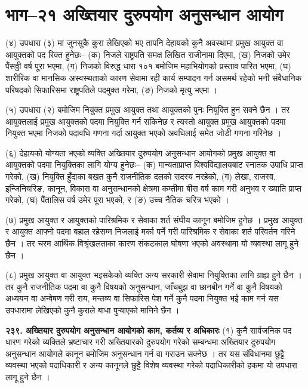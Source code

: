 \section{भाग–२१ अख्तियार दुरुपयोग अनुसन्धान आयोग}

(४) उपधारा (३) मा जुनसुकै कुरा लेखिएको भए तापनि देहायको कुनै अवस्थामा प्रमुख आयुक्त वा आयुक्तको पद रिक्त हुनेछः–
(क) निजले राष्ट्रपति समक्ष लिखित राजीनामा दिएमा,
(ख) निजको उमेर पैंसठ्ठी वर्ष पूरा भएमा,
(ग) निजको विरुद्ध धारा १०१ बमोजिम महाभियोगको प्रस्ताव पारित भएमा,
(घ) शारीरिक वा मानसिक अस्वस्थताको कारण सेवामा रही कार्य सम्पादन गर्न असमर्थ रहेको भनी संवैधानिक परिषदको सिफारिसमा राष्ट्रपतिले पदमुक्त गरेमा,
(ङ) निजको मृत्यु भएमा ।

(५) उपधारा (२) बमोजिम नियुक्त प्रमुख आयुक्त तथा आयुक्तको पुनः नियुक्ति हुन सक्ने छैन ।
तर आयुक्तलाई प्रमुख आयुक्तको पदमा नियुक्ति गर्न सकिनेछ र त्यस्तो आयुक्त प्रमुख आयुक्तको पदमा नियुक्त भएमा निजको पदावधि गणना गर्दा आयुक्त भएको अवधिलाई समेत जोडी गणना गरिनेछ ।

(६) देहायको योग्यता भएको व्यक्ति अख्तियार दुरुपयोग अनुसन्धान आयोगको प्रमुख आयुक्त वा आयुक्तको पदमा नियुक्तिका लागि योग्य हुनेछः–
(क) मान्यताप्राप्त विश्वविद्यालयबाट स्नातक उपाधि प्राप्त गरेको,
(ख) नियुक्ति हुँदाका बखत कुनै राजनीतिक दलको सदस्य नरहेको,
(ग) लेखा, राजस्व, इन्जिनियरिङ, कानून, विकास वा अनुसन्धानको क्षेत्रमा कम्तीमा बीस वर्ष काम गरी अनुभव र ख्याति प्राप्त
गरेको,
(घ) पैंतालिस वर्ष उमेर पूरा भएको, र
(ङ) उच्च नैतिक चरित्र भएको ।

(७) प्रमुख आयुक्त र आयुक्तको पारिश्रमिक र सेवाका शर्त संघीय कानून बमोजिम हुनेछ । प्रमुख आयुक्त र आयुक्त आफ्नो पदमा बहाल
रहेसम्म निजलाई मर्का पर्ने गरी पारिश्रमिक र सेवाका शर्त परिवर्तन गरिने छैन ।
तर चरम आर्थिक विश्रृंखलताका कारण संकटकाल घोषणा भएको अवस्थामा यो व्यवस्था लागू हुने छैन ।

(८) प्रमुख आयुक्त वा आयुक्त भइसकेको व्यक्ति अन्य सरकारी सेवामा नियुक्तिका लागि ग्राह्य हुने छैन ।
तर कुनै राजनीतिक पदमा वा कुनै विषयको अनुसन्धान, जाँचबुझ वा छानबीन गर्ने वा कुनै विषयको अध्ययन वा अन्वेषण गरी राय, मन्तव्य वा सिफारिस पेश गर्ने कुनै पदमा नियुक्त भई काम गर्न यस उपधारामा लेखिएको कुनै कुराले बाधा पुर्‍याएको मानिने छैन ।

\textbf{२३९. अख्तियार दुरुपयोग अनुसन्धान आयोगको काम, कर्तव्य र अधिकारः} (१) कुनै सार्वजनिक पद धारण गरेको व्यक्तिले भ्रष्टाचार गरी अख्तियारको दुरुपयोग गरेको सम्बन्धमा अख्तियार दुरुपयोग अनुसन्धान आयोगले कानून बमोजिम अनुसन्धान गर्न वा गराउन सक्नेछ ।
तर यस संविधानमा छुट्टै व्यवस्था भएको पदाधिकारी र अन्य कानूनले छुट्टै विशेष व्यवस्था गरेको पदाधिकारीको हकमा यो उपधारा लागू हुने छैन ।

